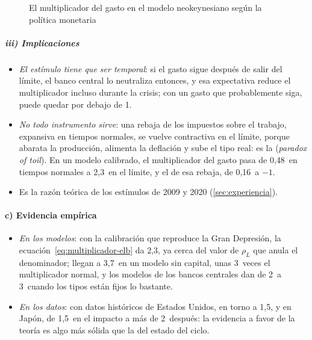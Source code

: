 \documentclass[11pt]{article}
\begin{document}
\begin{figure}[H]
\centering
\caption{El multiplicador del gasto en el modelo neokeynesiano según la política monetaria}\label{fig:multiplicador-politica-monetaria}
\end{figure}

\subparagraph{iii) Implicaciones}

\begin{itemize}
\item \emph{El estímulo tiene que ser temporal}: si el gasto sigue después de salir del límite, el banco central lo neutraliza entonces, y esa expectativa reduce el multiplicador incluso durante la crisis; con un gasto que probablemente siga, puede quedar por debajo de 1\nocite{Woodford2011Simple}.
\item \emph{No todo instrumento sirve}: una rebaja de los impuestos sobre el trabajo, expansiva en tiempos normales, se vuelve contractiva en el límite, porque abarata la producción, alimenta la deflación y sube el tipo real: es la  (\emph{paradox of toil})\nocite{Eggertsson2010Paradox}. En un modelo calibrado, el multiplicador del gasto pasa de 0,48~en tiempos normales a 2,3~en el límite, y el de esa rebaja, de 0,16~a $-1$\nocite{Eggertsson2011Fiscal}.
\item Es la razón teórica de los estímulos de 2009 y 2020 (\ref{sec:experiencia}).
\end{itemize}

\paragraph{c) Evidencia empírica}

\begin{itemize}
\item \emph{En los modelos}: con la calibración que reproduce la Gran Depresión, la ecuación~\eqref{eq:multiplicador-elb} da 2,3, ya cerca del valor de $\rho_L$ que anula el denominador\nocite{Woodford2011Simple}; \textcite{ChristianoEichenbaumRebelo2011} llegan a 3,7~en un modelo sin capital, unas 3~veces el multiplicador normal, y los modelos de los bancos centrales dan de 2~a 3~cuando los tipos están fijos lo bastante\nocite{Coenen2012Multiplicadores,Ramey2019Ten}.
\item \emph{En los datos}: con datos históricos de Estados Unidos, en torno a 1,5, y en Japón, de 1,5~en el impacto a más de 2~después\nocite{Ramey2019Ten,MiyamotoNguyenSergeyev2018}: la evidencia a favor de la teoría es algo más sólida que la del estado del ciclo.
\end{itemize}
\end{document}
